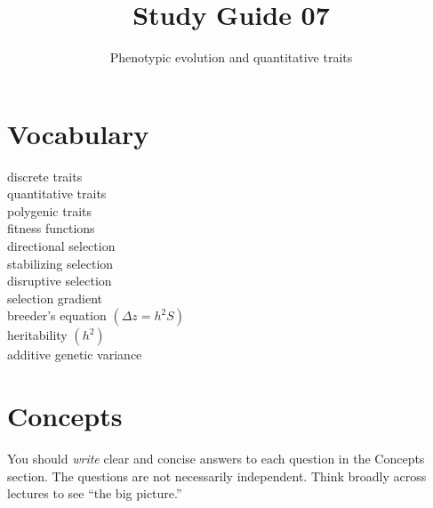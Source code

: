 \documentclass[letterpaper]{tufte-handout}
\title{Study Guide 07\hfill}
\author{Phenotypic evolution and quantitative traits}
\date{} %
\begin{document}
\maketitle	%

\section{Vocabulary}

\begin{multicols}{2}
discrete traits \\
quantitative traits \\
polygenic traits \\
fitness functions \\
directional selection \\
stabilizing selection \\
disruptive selection \\
selection gradient \\
breeder's equation $\left(\Delta z = h^2S\right)$ \\
heritability $\left(h^2\right)$ \\
additive genetic variance \\
\end{multicols}


\section{Concepts}

You should \emph{write} clear and concise answers to each question in the Concepts section.  The questions are not necessarily independent.  Think broadly across lectures to see ``the big picture.'' 
\end{document}
